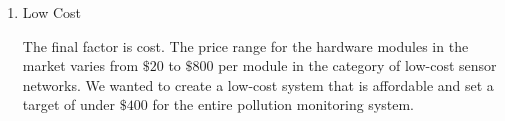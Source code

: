 \begin {enumerate}
\item {Low Cost}

The final factor is cost. The price range for the hardware modules in the market varies from $\$20 $ to $\$800 $ per module in the category of low-cost sensor networks. We wanted to create a low-cost system that is affordable and set a target of under $\$400$ for the entire pollution monitoring system.
\end{enumerate}





\par 


